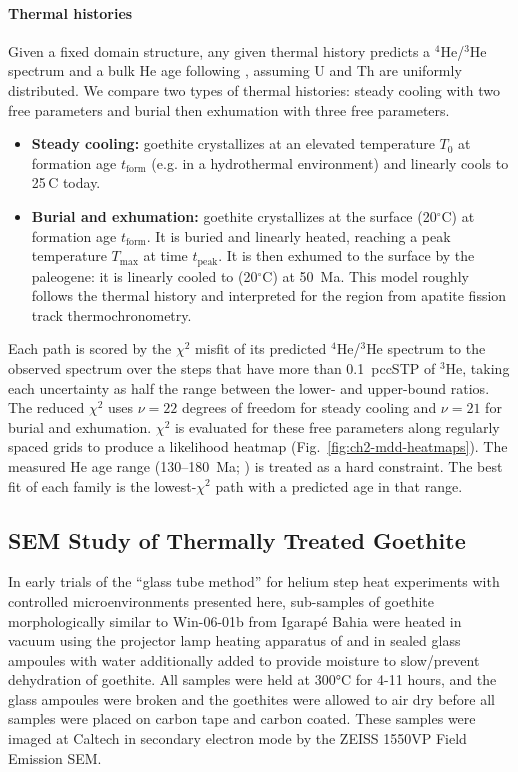 \paragraph{Thermal histories} Given a fixed domain structure, any given thermal history predicts a $^4$He/$^3$He spectrum and a 
bulk He age following \citet{shusterfarley2004}, assuming U and Th are uniformly distributed.
We compare two types of thermal histories: steady cooling with two free parameters and burial then exhumation with 
three free parameters. 
\begin{itemize}
  \item \textbf{Steady cooling:} goethite crystallizes at an elevated temperature $T_0$ at
  formation age $t_\mathrm{form}$ (e.g. in a hydrothermal environment) and linearly cools to 25\,\textdegree C today. 
  \item \textbf{Burial and exhumation:} goethite crystallizes at the surface (20$^{\circ}$C) at formation age $t_\mathrm{form}$. 
  It is buried and linearly heated, reaching a peak temperature $T_\mathrm{max}$ at time $t_\mathrm{peak}$. 
  It is then exhumed to the surface by the paleogene: it is linearly cooled to (20$^{\circ}$C) at 50~Ma. This model roughly 
  follows the thermal history \citet{gibsonstuwe2000} and \citet{mitchell1998} interpreted for the region from apatite 
  fission track thermochronometry. 
\end{itemize}
Each path is scored by the $\chi^2$ misfit of its predicted $^4$He/$^3$He spectrum to the observed spectrum over 
the \MDDNfit{} steps that have more than 0.1~pccSTP of $^3$He,
taking each uncertainty as half the range between the lower- and upper-bound ratios. The reduced
$\chi^2$ uses $\nu=22$ degrees of freedom for steady cooling and $\nu=21$ for burial and exhumation.
$\chi^2$ is evaluated for these free parameters along regularly spaced grids to produce a likelihood 
heatmap (Fig.~\ref{fig:ch2-mdd-heatmaps}). The measured He age range (130--180~Ma; \citealt{waltenberg2012}) 
is treated as a hard constraint. The best fit of each family is
the lowest-$\chi^2$ path with a predicted age in that range.

\subsection{SEM Study of Thermally Treated Goethite}\label{sem-study-of-thermally-treated-polycrystalline-goethite}

In early trials of the ``glass tube method'' for helium step heat
experiments with controlled microenvironments presented here,
sub-samples of goethite morphologically similar to Win-06-01b from
Igarapé Bahia \citep{shustervasconcelos2005,monteiro2017} were heated in
vacuum using the projector lamp heating apparatus of \citet{farley1999}
and in sealed glass ampoules with water additionally added to
provide moisture to slow/prevent dehydration of goethite. All samples
were held at 300°C for 4-11 hours, and the glass ampoules were broken
and the goethites were allowed to air dry before all samples were placed
on carbon tape and carbon coated. These samples were imaged at Caltech
in secondary electron mode by the ZEISS 1550VP Field Emission SEM.

